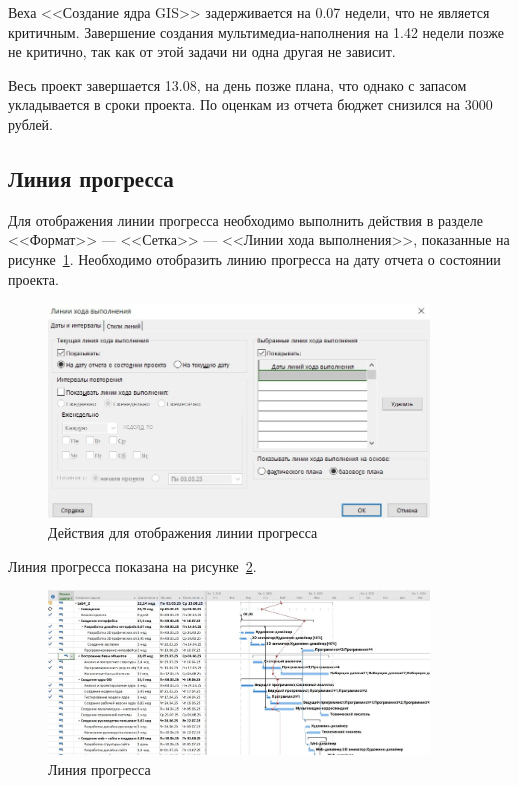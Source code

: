 Веха <<Создание ядра GIS>> задерживается на 0.07 недели, что не является критичным.
Завершение создания мультимедиа-наполнения на 1.42 недели позже не критично, так как от этой задачи ни одна другая не зависит.

Весь проект завершается 13.08, на день позже плана, что однако с запасом укладывается в сроки проекта.
По оценкам из отчета бюджет снизился на 3000 рублей.

\subsection{Линия прогресса}

Для отображения линии прогресса необходимо выполнить действия в разделе <<Формат>> --- <<Сетка>> --- <<Линии хода выполнения>>, показанные на рисунке~\ref{fig:screen29}.
Необходимо отобразить линию прогресса на дату отчета о состоянии проекта.

\begin{figure}[H]
	\centering
	\includegraphics[width=0.9\textwidth]{img/lab4/screen29.jpg}
	\caption{Действия для отображения линии прогресса}
	\label{fig:screen29}
\end{figure}

Линия прогресса показана на рисунке~\ref{fig:screen30}.

\begin{figure}[H]
	\centering
	\includegraphics[width=0.9\textwidth]{img/lab4/screen30.jpg}
	\caption{Линия прогресса}
	\label{fig:screen30}
\end{figure}

